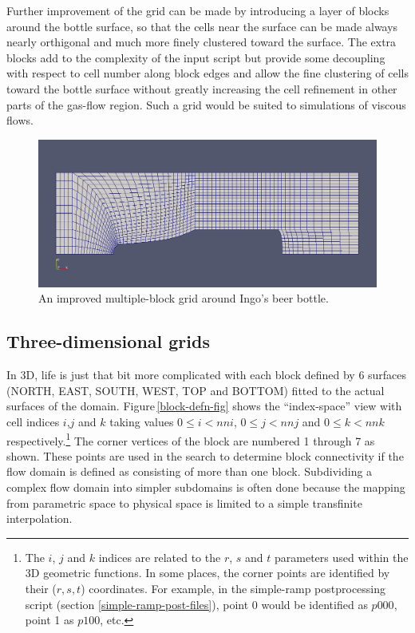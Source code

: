 \noindent
\topbar

\bottombar

\medskip
Further improvement of the grid can be made by introducing a layer of blocks around
the bottle surface, so that the cells near the surface can be made always nearly
orthigonal and much more finely clustered toward the surface.
The extra blocks add to the complexity of the input script but provide some decoupling 
with respect to cell number along block edges and allow the fine clustering of cells
toward the bottle surface without greatly increasing 
the cell refinement in other parts of the gas-flow region.
Such a grid would be suited to simulations of viscous flows.

\begin{figure}[htbp]
\begin{center}
\includegraphics[width=\textwidth]{../2D/beer-bottle/the_clustered_bottle.png}
\end{center}
\caption{An improved multiple-block grid around Ingo's beer bottle.}
\label{the-clustered-bottle-fig}
\end{figure}


\subsection{Three-dimensional grids}
\label{block3d-sec}
%
In 3D, life is just that bit more complicated with
each block defined by 6 surfaces (NORTH, EAST, SOUTH, WEST, TOP and BOTTOM) 
fitted to the actual surfaces of the domain.
Figure\,\ref{block-defn-fig} shows the ``index-space'' view with cell indices
$i$,$j$ and $k$ taking values $0 \le i < nni$, $0 \le j < nnj$ and 
$0 \le k < nnk$ respectively.\footnote{
  The $i$, $j$ and $k$ indices are related to the $r$, $s$ and $t$ parameters
  used within the 3D geometric functions.
  In some places, the corner points are identified by their ($r,s,t$)
  coordinates.
  For example, in the simple-ramp postprocessing script (section
  \ref{simple-ramp-post-files}), point 0 would be identified as $p000$, point 1
  as $p100$, etc.}
The corner vertices of the block are numbered 1 through 7 as shown.
These points are used in the search to determine block connectivity if the
flow domain is defined as consisting of more than one block.
Subdividing a complex flow domain into simpler subdomains is often done
because the mapping from parametric space to physical space is limited to a
simple transfinite interpolation.

